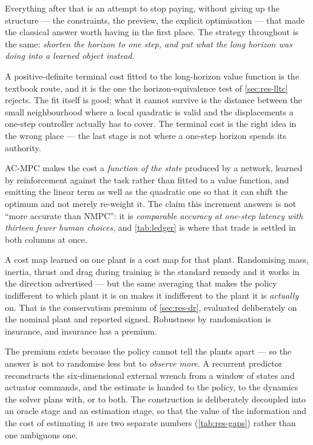\documentclass[11pt,a4paper,twoside,openright]{report}
\DeclareRobustCommand{\ACMPC}{AC\nbd MPC}
\theoremstyle{plain}
\theoremstyle{definition}
\theoremstyle{remark}
\DeclareRobustCommand{\nbd}{\mbox{-}}
\begin{document}
	Everything after that is an attempt to stop paying, without giving up the
	structure --- the constraints, the preview, the explicit optimisation --- that
	made the classical answer worth having in the first place. The strategy
	throughout is the same: \emph{shorten the horizon to one step, and put what the
	long horizon was doing into a learned object instead}.

	\begin{description}[leftmargin=*,style=nextline]
		\item[Increment 1 put it in the terminal cost, and that was not enough.] A
		positive-definite terminal cost fitted to the long-horizon value function is
		the textbook route, and it is the one the horizon-equivalence test of
		\cref{sec:res-lltc} rejects. The fit itself is good; what it cannot survive is
		the distance between the small neighbourhood where a local quadratic is valid
		and the displacements a one-step controller actually has to cover. The
		terminal cost is the right idea in the wrong place --- the last stage is not
		where a one-step horizon spends its authority.
		\item[Increment 2 put it in the whole cost map.] \ACMPC{} makes the cost a
		\emph{function of the state} produced by a network, learned by reinforcement
		against the task rather than fitted to a value function, and emitting the
		linear term as well as the quadratic one so that it can shift the optimum and
		not merely re-weight it. The claim this increment answers is not ``more
		accurate than NMPC'': it is \emph{comparable accuracy at one-step latency with
			thirteen fewer human choices}, and \cref{tab:ledger} is where that trade is
		settled in both columns at once.
		\item[Increment 3 bought generality, and paid for it in specificity.] A cost
		map learned on one plant is a cost map for that plant. Randomising mass,
		inertia, thrust and drag during training is the standard remedy and it works
		in the direction advertised --- but the same averaging that makes the policy
		indifferent to which plant it is on makes it indifferent to the plant it is
		\emph{actually} on. That is the conservatism premium of
		\cref{sec:res-dr}, evaluated deliberately on the nominal plant and reported
		signed. Robustness by randomisation is insurance, and insurance has a premium.
		\item[Increment 4 gave it the missing observation.] The premium exists because
		the policy cannot tell the plants apart --- so the answer is not to randomise
		less but to \emph{observe more}. A recurrent predictor reconstructs the
		six-dimensional external wrench from a window of states and actuator commands,
		and the estimate is handed to the policy, to the dynamics the solver plans
		with, or to both. The construction is deliberately decoupled into an oracle
		stage and an estimation stage, so that the value of the information and the
		cost of estimating it are two separate numbers (\cref{tab:res-gaps}) rather
		than one ambiguous one.
	\end{description}
\end{document}
